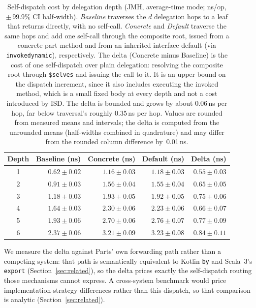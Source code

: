 \documentclass[acmsmall,nonacm]{acmart}
\theoremstyle{acmplain}
\newcommand{\code}[1]{\texttt{#1}}
\begin{document}
\begin{table}[htbp]
\centering
\caption{Self-dispatch cost by delegation depth (JMH, average-time mode; ns/op,
$\pm$\,99.9\% CI half-width). \emph{Baseline} traverses the $d$ delegation hops
to a leaf that returns directly, with no self-call. \emph{Concrete} and
\emph{Default} traverse the same hops and add one self-call through the composite
root, issued from a concrete part method and from an inherited interface default
(via \code{invokedynamic}), respectively. The delta (Concrete minus Baseline) is
the cost of one self-dispatch over plain
delegation: resolving the composite root through \code{\$selves} and issuing the
call to it. It is an upper bound on the dispatch increment, since it also
includes executing the invoked method, which is a small fixed body at every
depth and not a cost introduced by ISD. The delta is bounded and grows by about
0.06\,ns per hop, far below traversal's roughly 0.35\,ns per hop.
Values are rounded from measured means and intervals; the
delta is computed from the unrounded means (half-widths combined in quadrature)
and may differ from the rounded column difference by~0.01\,ns.}
\label{tab:bench}
{\small
\begin{tabular}{crrrr}
\toprule
Depth & Baseline (ns) & Concrete (ns) & Default (ns) & Delta (ns) \\
\midrule
1 & $0.62 \pm 0.02$ & $1.16 \pm 0.03$ & $1.18 \pm 0.03$ & $0.55 \pm 0.03$ \\
2 & $0.91 \pm 0.03$ & $1.56 \pm 0.04$ & $1.55 \pm 0.04$ & $0.65 \pm 0.05$ \\
3 & $1.18 \pm 0.03$ & $1.93 \pm 0.05$ & $1.92 \pm 0.05$ & $0.75 \pm 0.06$ \\
4 & $1.64 \pm 0.03$ & $2.30 \pm 0.06$ & $2.23 \pm 0.06$ & $0.66 \pm 0.07$ \\
5 & $1.93 \pm 0.06$ & $2.70 \pm 0.06$ & $2.76 \pm 0.07$ & $0.77 \pm 0.09$ \\
6 & $2.37 \pm 0.06$ & $3.21 \pm 0.09$ & $3.23 \pm 0.08$ & $0.84 \pm 0.11$ \\
\bottomrule
\end{tabular}
}
\end{table}

We measure the delta against Parts' own forwarding path rather than a competing
system: that path is semantically equivalent to Kotlin \code{by} and Scala~3's
\code{export} (Section~\ref{sec:related}), so the delta prices exactly the
self-dispatch routing those mechanisms cannot express. A cross-system benchmark would
price implementation-strategy differences rather than this dispatch, so that
comparison is analytic (Section~\ref{sec:related}).
\end{document}
